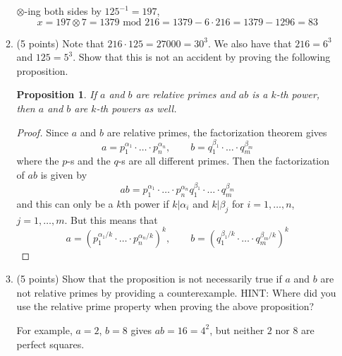 \documentclass[12pt]{article}
\newtheorem*{proposition}{Proposition}
\begin{document}
\begin{enumerate}
\begin{enumerate}
$\otimes$-ing both sides by $125^{-1}=197$,
\[
x=197\otimes 7=1379\textrm{ mod }216=1379-6\cdot 216=1379-1296=83
\]\newpage
\item (5 points) Note that $216\cdot 125=27000= 30^3$. We also have that $216=6^3$ and $125=5^3$. Show that this is not an accident by proving the following proposition.
\begin{proposition}
If $a$ and $b$ are relative primes and $ab$ is a $k$-th power, then $a$ and $b$ are $k$-th powers as well.
\end{proposition}
\begin{proof}
Since $a$ and $b$ are relative primes, the factorization theorem gives
\[
a=p_1^{\alpha_1}\cdot\dots\cdot p_n^{\alpha_n},\qquad b=q_1^{\beta_1}\cdot\dots\cdot q_m^{\beta_m}
\]
where the $p$-s and the $q$-s are all different primes. Then the factorization of $ab$ is given by
\[
ab=p_1^{\alpha_1}\cdot\dots\cdot p_n^{\alpha_n}q_1^{\beta_1}\cdot\dots\cdot q_m^{\beta_m}
\]
and this can only be a $k$th power if $k|\alpha_i$ and $k|\beta_j$ for $i=1,\dots, n$, $j=1,\dots, m$. But this means that
\[
a=\left(p_1^{\alpha_1/k}\cdot\dots\cdot p_n^{\alpha_n/k}\right)^k,\qquad b=\left(q_1^{\beta_1/k}\cdot\dots\cdot q_m^{\beta_m/k}\right)^k
\]
\end{proof}
\item (5 points) Show that the proposition is not necessarily true if $a$ and $b$ are not relative primes by providing a counterexample. HINT: Where did you use the relative prime property when proving the above proposition?

For example, $a=2$, $b=8$ gives $ab=16=4^2$, but neither $2$ nor $8$ are perfect squares.
\end{enumerate}


\end{enumerate}
\end{document}
